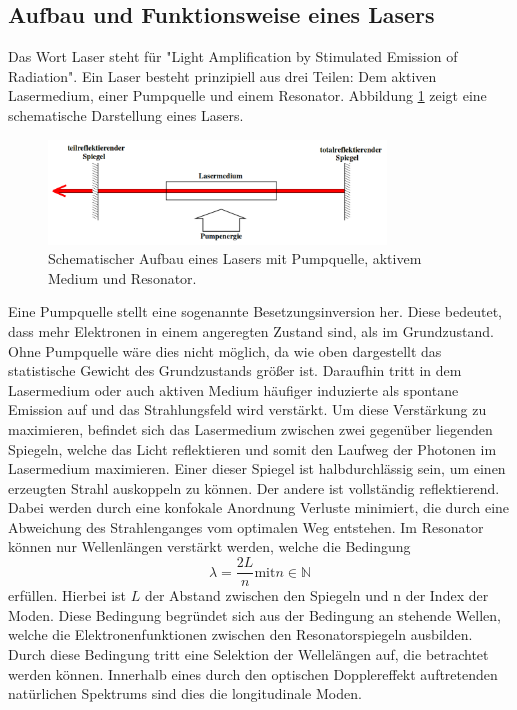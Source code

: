 \subsection{Aufbau und Funktionsweise eines Lasers}
Das Wort Laser steht für "Light Amplification by Stimulated Emission of Radiation".
Ein Laser besteht prinzipiell aus drei Teilen:
Dem aktiven Lasermedium, einer Pumpquelle und einem Resonator.
Abbildung \ref{pic:laser} zeigt eine schematische Darstellung eines Lasers.
\begin{figure}[htb]
  \centering
  \includegraphics[width=0.8\textwidth]{content/prinzip_laser.png}
  \caption{Schematischer Aufbau eines Lasers mit Pumpquelle, aktivem Medium und Resonator.}
  \label{pic:laser}
\end{figure}
Eine Pumpquelle stellt eine sogenannte Besetzungsinversion her.
Diese bedeutet, dass mehr Elektronen in einem angeregten Zustand sind, als
im Grundzustand. Ohne Pumpquelle wäre dies nicht möglich, da wie oben
dargestellt das statistische Gewicht des Grundzustands größer ist.
Daraufhin tritt in dem Lasermedium oder auch aktiven Medium häufiger
induzierte als spontane Emission auf und das
Strahlungsfeld wird verstärkt.
Um diese Verstärkung zu maximieren, befindet sich das Lasermedium zwischen
zwei gegenüber liegenden Spiegeln, welche das Licht reflektieren und somit
den Laufweg der Photonen im Lasermedium maximieren.
Einer dieser Spiegel ist halbdurchlässig sein,
um einen erzeugten Strahl auskoppeln zu können. Der andere ist vollständig reflektierend.
Dabei werden durch eine konfokale Anordnung Verluste minimiert,
die durch eine Abweichung des Strahlenganges vom optimalen Weg entstehen.
Im Resonator können nur Wellenlängen verstärkt werden, welche die Bedingung
\begin{equation}
  \lambda = \frac{2L}{n} \text{mit} n\in\mathds{N}
\end{equation}
erfüllen.
Hierbei ist $L$ der Abstand zwischen den Spiegeln und n der Index der Moden.
Diese Bedingung begründet sich aus der Bedingung an stehende Wellen,
welche die Elektronenfunktionen zwischen den Resonatorspiegeln ausbilden.
Durch diese Bedingung tritt eine Selektion der Wellelängen auf, die betrachtet werden können.
Innerhalb eines durch den optischen Dopplereffekt auftretenden natürlichen Spektrums
sind dies die longitudinale Moden.

